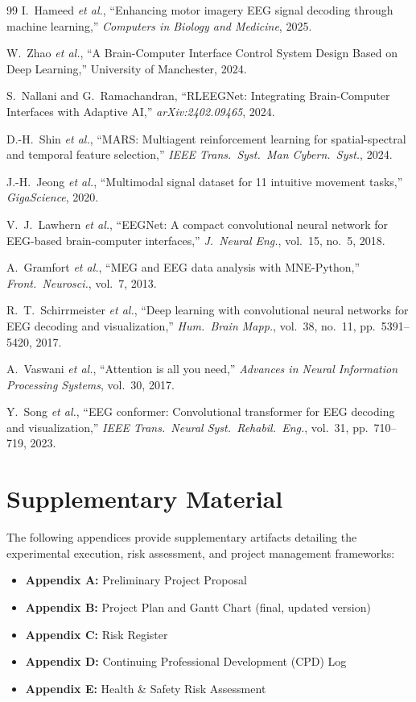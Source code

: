 \documentclass[12pt, a4paper]{article}
\begin{document}
\begin{thebibliography}{99}
I.~Hameed \emph{et al.}, ``Enhancing motor imagery EEG signal decoding through machine learning,'' \textit{Computers in Biology and Medicine}, 2025.

W.~Zhao \emph{et al.}, ``A Brain-Computer Interface Control System Design Based on Deep Learning,'' University of Manchester, 2024.

S.~Nallani and G.~Ramachandran, ``RLEEGNet: Integrating Brain-Computer Interfaces with Adaptive AI,'' \textit{arXiv:2402.09465}, 2024.

D.-H.~Shin \emph{et al.}, ``MARS: Multiagent reinforcement learning for spatial-spectral and temporal feature selection,'' \textit{IEEE Trans.\ Syst.\ Man Cybern.\ Syst.}, 2024.

J.-H.~Jeong \emph{et al.}, ``Multimodal signal dataset for 11 intuitive movement tasks,'' \textit{GigaScience}, 2020.

V.~J.~Lawhern \emph{et al.}, ``EEGNet: A compact convolutional neural network for EEG-based brain-computer interfaces,'' \textit{J.\ Neural Eng.}, vol.~15, no.~5, 2018.

A.~Gramfort \emph{et al.}, ``MEG and EEG data analysis with MNE-Python,'' \textit{Front.\ Neurosci.}, vol.~7, 2013.

R.~T.~Schirrmeister \emph{et al.}, ``Deep learning with convolutional neural networks for EEG decoding and visualization,'' \textit{Hum.\ Brain Mapp.}, vol.~38, no.~11, pp.~5391--5420, 2017.

A.~Vaswani \emph{et al.}, ``Attention is all you need,'' \textit{Advances in Neural Information Processing Systems}, vol.~30, 2017.

Y.~Song \emph{et al.}, ``EEG conformer: Convolutional transformer for EEG decoding and visualization,'' \textit{IEEE Trans.\ Neural Syst.\ Rehabil.\ Eng.}, vol.~31, pp.~710--719, 2023.
\end{thebibliography}

\newpage
\section*{Supplementary Material}

The following appendices provide supplementary artifacts detailing the experimental execution, risk assessment, and project management frameworks:

\begin{itemize}
    \item \textbf{Appendix A:} Preliminary Project Proposal
    \item \textbf{Appendix B:} Project Plan and Gantt Chart (final, updated version)
    \item \textbf{Appendix C:} Risk Register
    \item \textbf{Appendix D:} Continuing Professional Development (CPD) Log
    \item \textbf{Appendix E:} Health \& Safety Risk Assessment
\end{itemize}
\end{document}
